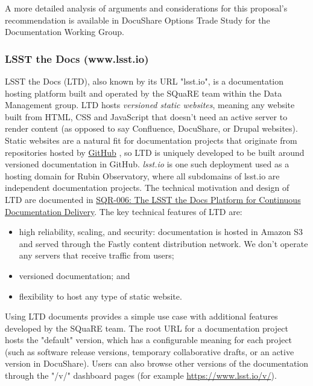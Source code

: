 A more detailed analysis of arguments and considerations for this proposal's recommendation is available in DocuShare Options Trade Study for the Documentation Working Group. 

\subsubsection{LSST the Docs (www.lsst.io)}

LSST the Docs (LTD), also known by its URL "lsst.io", is a documentation hosting platform built and operated by the SQuaRE team within the Data Management group.
LTD hosts \emph{versioned static websites}, meaning any website built from HTML, CSS and JavaScript that doesn't need an active server to render content (as opposed to say Confluence, DocuShare, or Drupal websites).
Static websites are a natural fit for documentation projects that originate from repositories hosted by \href{https://www.github.com}{GitHub} \citep{GitHub-cite}, so LTD is uniquely developed to be built around versioned documentation in GitHub.
\emph{lsst.io} is one such deployment used as a hosting domain for Rubin Observatory, where all subdomains of lsst.io are independent documentation projects.
The technical motivation and design of LTD are documented in \href{https://sqr-006.lsst.io}{SQR-006: The LSST the Docs Platform for Continuous Documentation Delivery}. 
The key technical features of LTD are:

\begin{itemize}
	\item high reliability, scaling, and security: documentation is hosted in Amazon S3 and served through the Fastly content distribution network.
	We don't operate any servers that receive traffic from users;
	\item versioned documentation; and
	\item flexibility to host any type of static website.
\end{itemize}

Using LTD documents provides a simple use case with additional features developed by the SQuaRE team.
The root URL for a documentation project hosts the "default" version, which has a configurable meaning for each project (such as software release versions, temporary collaborative drafts, or an active version in DocuShare).
Users can also browse other versions of the documentation through the "/v/" dashboard pages (for example \url{https://www.lsst.io/v/}).

